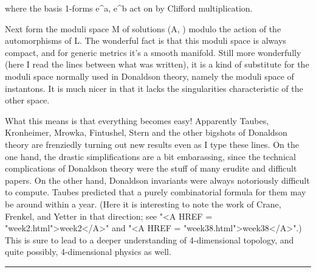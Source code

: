where the basis 1-forms e^a, e^b act on \Psi  by Clifford multiplication.

Next form the moduli space M of solutions (A, \Psi ) modulo the action of
the automorphisms of L.  The wonderful fact is that this moduli space is
always compact, and for generic metrics it's a smooth manifold.  Still
more wonderfully (here I read the lines between what was written), it is
a kind of substitute for the moduli space normally used in Donaldson
theory, namely the moduli space of instantons.  It is much nicer in that
it lacks the singularities characteristic of the other space.

What this means is that everything becomes easy!  Apparently Taubes,
Kronheimer, Mrowka, Fintushel, Stern and the other bigshots of Donaldson
theory are frenziedly turning out new results even as I type these
lines.  On the one hand, the drastic simplifications are a bit
embarassing, since the technical complications of Donaldson theory were
the stuff of many erudite and difficult papers.  On the other hand, 
Donaldson invariants were always notoriously difficult to compute.  
Taubes predicted that a purely combinatorial formula for them may be
around within a year.  (Here it is interesting to note the work of
Crane, Frenkel, and Yetter in that direction; see "<A HREF = "week2.html">week2</A>" and "<A HREF = "week38.html">week38</A>".)
This is sure to lead to a deeper understanding of 4-dimensional
topology, and quite possibly, 4-dimensional physics as well.
\par\noindent\rule{\textwidth}{0.4pt}

